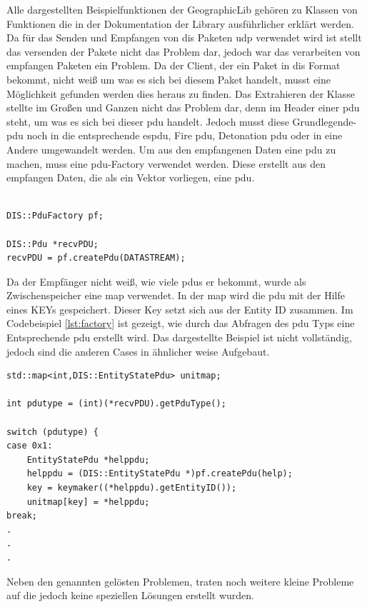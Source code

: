 Alle dargestellten Beispielfunktionen der \glqq GeographicLib\grqq{} gehören zu  Klassen von Funktionen die in der Dokumentation der Library ausführlicher erklärt werden.
\\
Da für das Senden und Empfangen von \ac{dis} Paketen  \ac{udp}  verwendet wird ist stellt das versenden der Pakete nicht das Problem dar, jedoch war das verarbeiten von empfangen Paketen ein Problem. Da der Client, der ein Paket in \ac{dis} Format bekommt, nicht weiß um was es sich bei diesem Paket handelt, musst eine Möglichkeit gefunden werden dies heraus zu finden. Das Extrahieren der Klasse stellte im Großen und Ganzen nicht das Problem dar, denn im Header einer \ac{pdu} steht, um was es sich bei dieser \ac{pdu} handelt. Jedoch musst diese Grundlegende-\ac{pdu} noch in die entsprechende \ac{espdu}, Fire \ac{pdu}, Detonation \ac{pdu} oder in eine Andere umgewandelt werden. Um aus den empfangenen Daten eine \ac{pdu} zu machen, muss eine \glqq\ac{pdu}-Factory\grqq{} verwendet werden.  
Diese erstellt aus den empfangen Daten, die als ein Vektor vorliegen, eine \ac{pdu}. \\
\\
\begin{lstlisting}[caption = PDU Factory ,label={lst:factory}]
DIS::PduFactory pf;

DIS::Pdu *recvPDU;
recvPDU = pf.createPdu(DATASTREAM);
\end{lstlisting}
Da der Empfänger nicht weiß, wie viele \acp{pdu} er bekommt, wurde als Zwischenspeicher eine \glqq map\grqq{}  verwendet. In der \glqq map\grqq{} wird die \ac{pdu} mit der Hilfe eines KEYs gespeichert. Dieser Key setzt sich aus der Entity ID zusammen. Im Codebeispiel \ref{lst:factory} ist gezeigt, wie durch das Abfragen des \ac{pdu} Typs eine Entsprechende \ac{pdu} erstellt wird. Das dargestellte Beispiel ist nicht vollständig, jedoch sind die anderen Cases in ähnlicher weise Aufgebaut.

\begin{lstlisting}[caption = PDU-Typ kovertieren ,label={lst:factory}]
std::map<int,DIS::EntityStatePdu> unitmap;

int pdutype = (int)(*recvPDU).getPduType();

switch (pdutype) {
case 0x1:
	EntityStatePdu *helppdu;
	helppdu = (DIS::EntityStatePdu *)pf.createPdu(help);
	key = keymaker((*helppdu).getEntityID());
	unitmap[key] = *helppdu;
break;
.
.
.
\end{lstlisting}
       
Neben den genannten gelösten Problemen, traten noch weitere kleine Probleme auf die jedoch keine speziellen Lösungen erstellt wurden.
